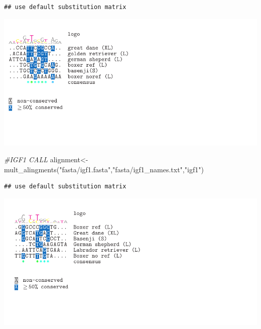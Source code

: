 \documentclass[
]{article}
\newenvironment{Shaded}{\begin{snugshade}}{\end{snugshade}}
\newcommand{\CommentTok}[1]{\textcolor[rgb]{0.56,0.35,0.01}{\textit{#1}}}
\newcommand{\FunctionTok}[1]{\textcolor[rgb]{0.00,0.00,0.00}{#1}}
\newcommand{\NormalTok}[1]{#1}
\newcommand{\OtherTok}[1]{\textcolor[rgb]{0.56,0.35,0.01}{#1}}
\newcommand{\StringTok}[1]{\textcolor[rgb]{0.31,0.60,0.02}{#1}}
\begin{document}
\begin{verbatim}
## use default substitution matrix
\end{verbatim}

\includegraphics{LCORL.pdf}

\begin{Shaded}
\begin{Highlighting}[]
\CommentTok{\#IGF1 CALL}
\NormalTok{alignment}\OtherTok{\textless{}{-}}\FunctionTok{mult\_alingments}\NormalTok{(}\StringTok{"fasta/igf1.fasta"}\NormalTok{,}\StringTok{"fasta/igf1\_names.txt"}\NormalTok{,}\StringTok{"igf1"}\NormalTok{)}
\end{Highlighting}
\end{Shaded}

\begin{verbatim}
## use default substitution matrix
\end{verbatim}

\includegraphics{igf1.pdf}
\end{document}
